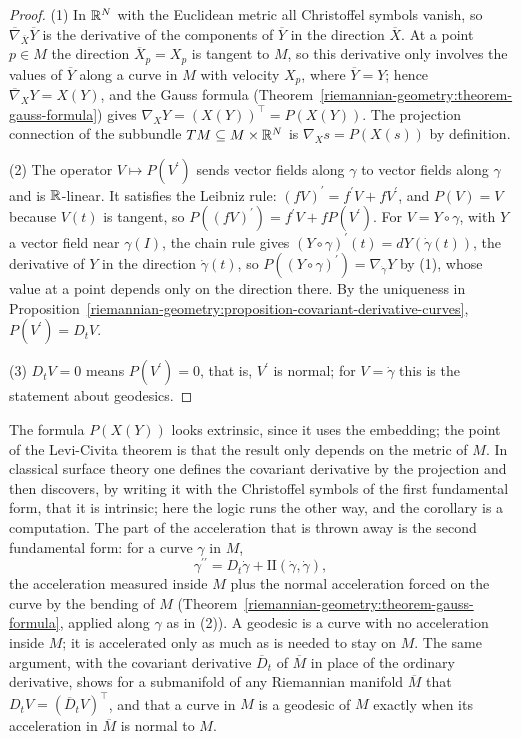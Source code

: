 \begin{proof}
(1) In $\mathbb{R}^N$ with the Euclidean metric all Christoffel symbols vanish, so $\overline{\nabla}_{\overline{X}}\overline{Y}$ is the derivative of the components of $\overline{Y}$ in the direction $\overline{X}$. At a point
$p \in M$ the direction $\overline{X}_p = X_p$ is tangent to $M$, so this derivative only involves the values of $\overline{Y}$ along a curve in $M$ with velocity $X_p$, where $\overline{Y} = Y$; hence
$\overline{\nabla}_XY = X(Y)$, and the Gauss formula (Theorem~\ref{riemannian-geometry:theorem-gauss-formula}) gives $\nabla_XY = (X(Y))^\top = P(X(Y))$. The projection connection of the subbundle
$TM \subseteq M \times \mathbb{R}^N$ is $\nabla_Xs = P(X(s))$ by definition.

(2) The operator $V \mapsto P(V^{\prime})$ sends vector fields along $\gamma$ to vector fields along $\gamma$ and is $\mathbb{R}$-linear. It satisfies the Leibniz rule: $(fV)^{\prime} = f^{\prime}V + fV^{\prime}$, and $P(V) = V$
because $V(t)$ is tangent, so $P((fV)^{\prime}) = f^{\prime}V + fP(V^{\prime})$. For $V = Y \circ \gamma$, with $Y$ a vector field near $\gamma(I)$, the chain rule gives $(Y \circ \gamma)^{\prime}(t) = dY(\dot\gamma(t))$, the derivative of
$Y$ in the direction $\dot\gamma(t)$, so $P((Y \circ \gamma)^{\prime}) = \nabla_{\dot\gamma}Y$ by (1), whose value at a point depends only on the direction there. By the uniqueness in
Proposition~\ref{riemannian-geometry:proposition-covariant-derivative-curves}, $P(V^{\prime}) = D_tV$.

(3) $D_tV = 0$ means $P(V^{\prime}) = 0$, that is, $V^{\prime}$ is normal; for $V = \dot\gamma$ this is the statement about geodesics.
\end{proof}

The formula $P(X(Y))$ looks extrinsic, since it uses the embedding; the point of the Levi-Civita theorem is that the result only depends on the metric of $M$. In classical surface theory one
defines the covariant derivative by the projection and then discovers, by writing it with the Christoffel symbols of the first fundamental form, that it is intrinsic; here the logic runs the other way,
and the corollary is a computation. The part of the acceleration that is thrown away is the second fundamental form: for a curve $\gamma$ in $M$,
\[
\gamma^{\prime\prime} = D_t\dot\gamma + \mathrm{II}(\dot\gamma, \dot\gamma),
\]
the acceleration measured inside $M$ plus the normal acceleration forced on the curve by the bending of $M$ (Theorem~\ref{riemannian-geometry:theorem-gauss-formula}, applied along $\gamma$ as in (2)). A geodesic
is a curve with no acceleration inside $M$; it is accelerated only as much as is needed to stay on $M$. The same argument, with the covariant derivative $\overline{D}_t$ of $\overline{M}$ in place of
the ordinary derivative, shows for a submanifold of any Riemannian manifold $\overline{M}$ that $D_tV = (\overline{D}_tV)^\top$, and that a curve in $M$ is a geodesic of $M$ exactly when its acceleration in
$\overline{M}$ is normal to $M$.

